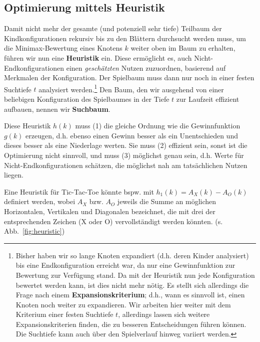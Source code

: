 \documentclass[a4paper]{scrartcl}
\newcommand\q[1]{\glqq #1\grqq}
\begin{document}
\subsection{Optimierung mittels Heuristik}
Damit nicht mehr der gesamte (und potenziell sehr tiefe) Teilbaum der Kindkonfigurationen rekursiv bis zu den Blättern durchsucht werden muss, um die Minimax-Bewertung eines Knotens $k$ weiter oben im Baum zu erhalten, führen wir nun eine \textbf{Heuristik} ein. Diese ermöglicht es, auch Nicht-Endkonfigurationen einen \textit{geschätzten} Nutzen zuzuordnen, basierend auf Merkmalen der Konfiguration. Der Spielbaum muss dann nur noch in einer festen Suchtiefe $t$ analysiert werden.\footnote{Bisher haben wir so lange Knoten expandiert (d.h. deren Kinder analysiert) bis eine Endkonfiguration erreicht war, da nur eine Gewinnfunktion zur Bewertung zur Verfügung stand. Da mit der Heuristik nun jede Konfiguration bewertet werden kann, ist dies nicht mehr nötig. Es stellt sich allerdings die Frage nach einem \textbf{Expansionskriterium}; d.h., wann es sinnvoll ist, einen Knoten noch weiter zu expandieren. Wir arbeiten hier weiter mit dem Kriterium einer festen Suchtiefe $t$, allerdings lassen sich weitere Expansionskriterien finden, die zu besseren Entscheidungen führen können. Die Suchtiefe kann auch über den Spielverlauf hinweg variiert werden.} Den Baum, den wir ausgehend von einer beliebigen Konfiguration des Spielbaumes in der Tiefe $t$ zur Laufzeit effizient aufbauen, nennen wir \textbf{Suchbaum}.

Diese Heuristik $h(k)$ muss (1) die gleiche Ordnung wie die Gewinnfunktion $g(k)$ erzeugen, d.h. ebenso einen Gewinn besser als ein Unentschieden und dieses besser als eine Niederlage werten. Sie muss (2) effizient sein, sonst ist die Optimierung nicht sinnvoll, und muss (3) möglichst genau sein, d.h. Werte für Nicht-Endkonfigurationen schätzen, die möglichst nah am tatsächlichen Nutzen liegen.

\newpage
Eine Heuristik für Tic-Tac-Toe könnte bspw. mit $h_1(k) = A_X(k) - A_O(k)$ definiert werden, wobei $A_{X}$ bzw. $A_{O}$ jeweils die Summe an möglichen Horizontalen, Vertikalen und Diagonalen bezeichnet, die mit drei der entsprechenden Zeichen (\q{X} oder \q{O}) vervollständigt werden könnten. (s. Abb.~\ref{fig:heuristic})
\end{document}

